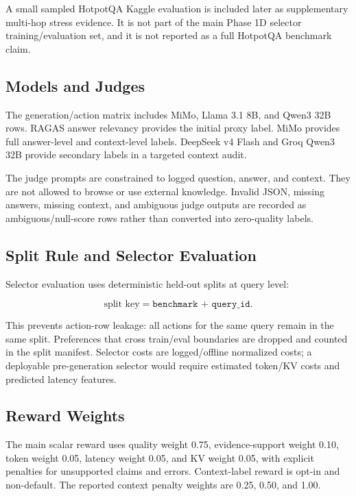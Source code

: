 A small sampled HotpotQA Kaggle evaluation is included later as supplementary multi-hop stress evidence. It is not part of the main Phase 1D selector training/evaluation set, and it is not reported as a full HotpotQA benchmark claim.

\subsection{Models and Judges}

The generation/action matrix includes MiMo, Llama 3.1 8B, and Qwen3 32B rows. RAGAS answer relevancy provides the initial proxy label. MiMo provides full answer-level and context-level labels. DeepSeek v4 Flash and Groq Qwen3 32B provide secondary labels in a targeted context audit.

The judge prompts are constrained to logged question, answer, and context. They are not allowed to browse or use external knowledge. Invalid JSON, missing answers, missing context, and ambiguous judge outputs are recorded as ambiguous/null-score rows rather than converted into zero-quality labels.

\subsection{Split Rule and Selector Evaluation}

Selector evaluation uses deterministic held-out splits at query level:

\[
\text{split key} = \texttt{benchmark + query\_id}.
\]

This prevents action-row leakage: all actions for the same query remain in the same split. Preferences that cross train/eval boundaries are dropped and counted in the split manifest. Selector costs are logged/offline normalized costs; a deployable pre-generation selector would require estimated token/KV costs and predicted latency features.

\subsection{Reward Weights}

The main scalar reward uses quality weight 0.75, evidence-support weight 0.10, token weight 0.05, latency weight 0.05, and KV weight 0.05, with explicit penalties for unsupported claims and errors. Context-label reward is opt-in and non-default. The reported context penalty weights are 0.25, 0.50, and 1.00.
